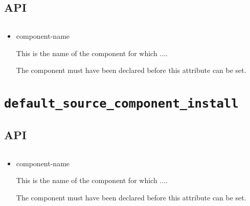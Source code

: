 \subsection{API}

\begin{verbatim}

\end{verbatim}

\begin{itemize}
\item component-name

  This is the name of the component for which ....

  The component must have been declared before this attribute can be
  set.

\end{itemize}

\section{\texttt{default\_source\_component\_install}}\label{api:default-source-component-install}

\subsection{API}

\begin{verbatim}

\end{verbatim}

\begin{itemize}
\item component-name

  This is the name of the component for which ....

  The component must have been declared before this attribute can be
  set.

\end{itemize}
